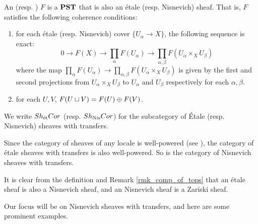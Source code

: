 \begin{defn}\label{def_etale_sheaf}\label{def_nis_sheaf}
An  (resp. ) $F$ is a $\mathbf{PST}$ that is also
an \'etale (resp. Nisnevich) sheaf. That is, $F$ satisfies the
following coherence conditions:
\begin{enumerate}
\item for each \'etale (resp. Nisnevich) cover $\{U_\alpha \to 
X\}$, the following sequence is exact:
\[
0 \to F(X) \to \prod_\alpha F(U_\alpha) \to \prod_{\alpha, \beta} 
   F(U_\alpha \times_X U_\beta)
\]
where the map $\prod_\alpha F(U_\alpha) \to \prod_{\alpha, \beta} 
F(U_\alpha \times_X U_\beta)$ is given by the first and second 
projections from $U_\alpha \times_X U_\beta$ to $U_\alpha$ and
$U_\beta$ respectively for each $\alpha, \beta$.

\item for each $U, V$, $F(U \sqcup V) = F(U) \oplus F(V)$.
\end{enumerate}

\noindent We write $Sh_{\mathrm{\acute{e}t}}Cor$ (resp. $Sh_{\mathrm{Nis}}Cor$) for the 
subcategory of \'Etale (resp. Nisnevich) sheaves with transfers.
\end{defn}

Since the category of sheaves of any locale is well-powered
(see \cite[2.3.7]{Bo}), the category of \'etale sheaves 
with transfers is also well-powered. So is the category of 
Nisnevich sheaves with transfers.

\begin{rmk}
It is clear from the definition and Remark \ref{rmk_comp_of_tops}
that an \'etale sheaf is also a Nisnevich sheaf, and an Nisnevich
sheaf is a Zariski sheaf.
\end{rmk}

Our focus will be on Nisnevich sheaves with transfers, and here 
are some prominent examples.

